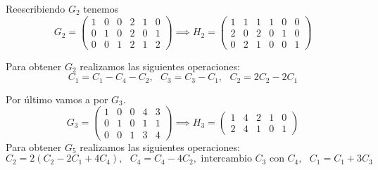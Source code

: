 \begin{problem}[16]
Reescribiendo $G_2$ tenemos
\[G_2=\left(\begin{array}{cccccc}
1 & 0 & 0 & 2 & 1 & 0 \\
0 & 1 & 0 & 2 & 0 & 1 \\
0 & 0 & 1 & 2 & 1 & 2
\end{array}\right) \implies H_2 = \left(\begin{array}{cccccc}
1 & 1 & 1 & 1 & 0 & 0 \\
2 & 0 & 2 & 0 & 1 & 0 \\
0 & 2 & 1 & 0 & 0 & 1
\end{array}\right)\]

Para obtener $G_2$ realizamos las siguientes operaciones:
\[C_1 = C_1-C_4-C_2, \text{ } C_3=C_3-C_1, \text{ } C_2=2C_2-2C_1\]

Por último vamos a por $G_3$.
\[G_3=\left(\begin{array}{ccccc}
1 & 0 & 0 & 4 & 3 \\
0 & 1 & 0 & 1 & 1 \\
0 & 0 & 1 & 3 & 4
\end{array}\right) \implies H_3=\left(\begin{array}{ccccc}
1 & 4 & 2 & 1 & 0 \\
2 & 4 & 1 & 0 & 1
\end{array}\right)\]
Para obtener $G_5$ realizamos las siguientes operaciones:
\[C_2 = 2(C_2-2C_1+4C_4), \text{ } C_4 = C_4-4C_2, \text{ intercambio }C_3 \text{ con }C_4, \text{ } C_1=C_1+3C_3\]
\end{problem}


